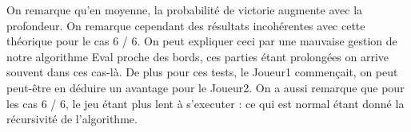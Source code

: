 \documentclass[a4paper, 10pt, french]{article}
\begin{document}
{{        On remarque qu'en moyenne, la probabilité de victorie augmente avec la profondeur. On remarque cependant des résultats
        incohérentes avec cette théorique pour le cas 6 / 6. On peut expliquer ceci par une mauvaise gestion de notre algorithme
        Eval proche des bords, ces parties étant prolongées on arrive souvent dans ces cas-là. De plus pour ces tests, le Joueur1
        commençait, on peut peut-être en déduire un avantage pour le Joueur2.
        On a aussi remarque que pour les cas 6 / 6, le jeu étant plus lent à s'executer : ce qui est normal étant donné la
        récursivité de l'algorithme.
    }
}
\end{document}
